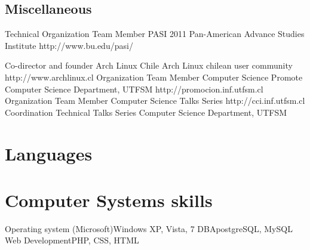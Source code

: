\documentclass[11pt,a4paper]{moderncv}
\begin{document}
\subsection{Miscellaneous}
		{Technical Organization Team Member}
		{PASI 2011}
		{Pan-American Advance Studies Institute}
		{http://www.bu.edu/pasi/}
		{}

		{Co-director and founder}
		{Arch Linux Chile}
		{Arch Linux chilean user community}
		{http://www.archlinux.cl}
		{}
		{Organization Team Member}
		{Computer Science Promote}
		{Computer Science Department, UTFSM}
		{http://promocion.inf.utfsm.cl}
		{}
		{Organization Team Member}
		{Computer Science Talks Series}
		{http://cci.inf.utfsm.cl}
		{}{}
		{Coordination}
		{Technical Talks Series}
		{Computer Science Department, UTFSM}
		{}{}


\section{Languages}


\section{Computer Systems skills}
				{Operating system (Microsoft)}{Windows XP, Vista, 7}
				{DBA}{postgreSQL, MySQL}
				{Web Development}{PHP, CSS, HTML}
\newpage
\end{document}
